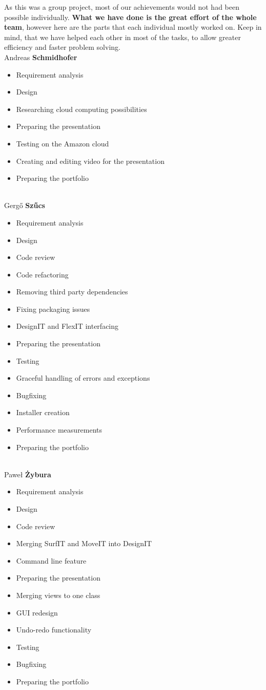 \documentclass[a4paper, 11pt, article]{report}
\begin{document}
As this was a group project, most of our achievements would not had been possible individually. \textbf{What we have done is the great effort of the whole team}, however here are the parts that each individual mostly worked on. Keep in mind, that we have helped each other in most of the tasks, to allow greater efficiency and faster problem solving. \\

\noindent Andreas \textbf{Schmidhofer} 
\begin{itemize}
	\item Requirement analysis
	\item Design
	\item Researching cloud computing possibilities
	\item Preparing the presentation
	\item Testing on the Amazon cloud
	\item Creating and editing video for the presentation
	\item Preparing the portfolio
\end{itemize} 

\noindent \\ Gergő \textbf{Szűcs}
\begin{itemize}
	\item Requirement analysis
	\item Design
	\item Code review
	\item Code refactoring
	\item Removing third party dependencies
	\item Fixing packaging issues
	\item DesignIT and FlexIT interfacing
	\item Preparing the presentation
	\item Testing 
	\item Graceful handling of errors and exceptions
	\item Bugfixing
	\item Installer creation
	\item Performance measurements
	\item Preparing the portfolio
\end{itemize}

\noindent \\ Paweł \textbf{Żybura} 
\begin{itemize}
	\item Requirement analysis
	\item Design
	\item Code review
	\item Merging SurfIT and MoveIT into DesignIT
	\item Command line feature
	\item Preparing the presentation
	\item Merging views to one class
	\item GUI redesign
	\item Undo-redo functionality
	\item Testing 
	\item Bugfixing
	\item Preparing the portfolio
\end{itemize}
\end{document}
